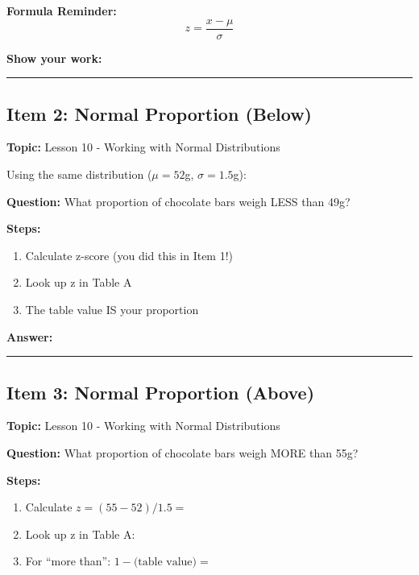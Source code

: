 \documentclass[11pt]{article}
\begin{document}
\textbf{Formula Reminder:}
\[
z = \frac{x - \mu}{\sigma}
\]

\textbf{Show your work:}

\vspace{1.5in}

\hrule

\vspace{0.2in}

\subsection*{Item 2: Normal Proportion (Below)}
\textbf{Topic:} Lesson 10 - Working with Normal Distributions

Using the same distribution ($\mu = 52$g, $\sigma = 1.5$g):

\textbf{Question:} What proportion of chocolate bars weigh LESS than 49g?

\textbf{Steps:}
\begin{enumerate}
    \item Calculate z-score (you did this in Item 1!)
    \item Look up z in Table A
    \item The table value IS your proportion
\end{enumerate}

\textbf{Answer:}

\vspace{1.5in}

\hrule

\vspace{0.2in}

\subsection*{Item 3: Normal Proportion (Above)}
\textbf{Topic:} Lesson 10 - Working with Normal Distributions

\textbf{Question:} What proportion of chocolate bars weigh MORE than 55g?

\textbf{Steps:}
\begin{enumerate}
    \item Calculate $z = (55 - 52) / 1.5 = $ \underline{\hspace{1in}}
    \item Look up z in Table A: \underline{\hspace{1in}}
    \item For ``more than'': $1 - \text{(table value)} = $ \underline{\hspace{1in}}
\end{enumerate}
\end{document}
